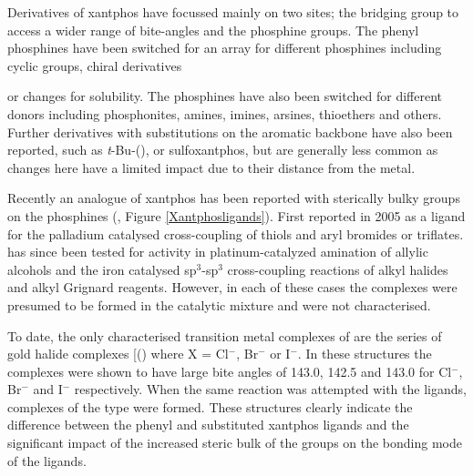 
Derivatives of xantphos have focussed mainly on two sites; the bridging group to access a wider range of bite-angles and the phosphine groups.  The phenyl phosphines have been switched for an array for different phosphines including cyclic groups\cite{Veen2000b}, chiral derivatives{\cite{Kamer2001} or changes for solubility.\cite{Buhling1997}  The phosphines have also been switched for different donors including phosphonites,\cite{Dieleman2001} amines, imines, arsines,\cite{Veen2000b} thioethers and others.  Further derivatives with substitutions on the aromatic backbone have also been reported, such as \emph{t}-Bu-(\Phxantphos), or sulfoxantphos,\cite{Goedheijt1998} but are generally less common as changes here have a limited impact due to their distance from the metal.  

Recently an analogue of xantphos has been reported with sterically bulky \tBu{} groups on the phosphines (\tBuXantphos, Figure \ref{Xantphosligands}). First reported in 2005 as a ligand for the palladium catalysed cross-coupling of thiols and aryl bromides or triflates\cite{Mispelaere2005}.  \tBuXantphos{} has since been tested for activity in platinum-catalyzed amination of allylic alcohols\cite{Ohshima2009} and the iron catalysed sp$^3$-sp$^3$ cross-coupling reactions of alkyl halides and alkyl Grignard reagents.\cite{Dongol2007}  However, in each of these cases the complexes were presumed to be formed in the catalytic mixture and were not characterised.  

To date, the only characterised transition metal complexes of \tBuxantphos{} are the series of gold halide complexes [(\tBuxantphos)\ce{Au][AuX2]} where X = Cl$^-$, Br$^-$ or I$^-$.\cite{Partyka2010}  In these structures the \tBuxantphos{} complexes were shown to have large bite angles of 143.0, 142.5 and 143.0\degrees{} for Cl$^-$, Br$^-$ and I$^-$ respectively.  When the same reaction was attempted with the \Phxantphos{} ligands, complexes of the type  were formed.\cite{Pintado2004, Partyka2010}  These structures clearly indicate the difference between the phenyl and \tBu{} substituted xantphos ligands and the significant impact of the increased steric bulk of the \tBu{} groups on the bonding mode of the ligands.  

}
